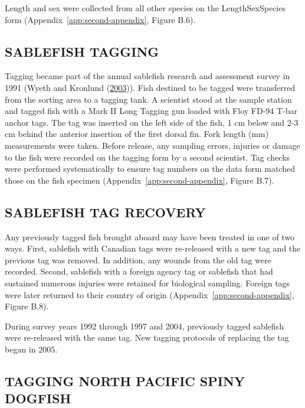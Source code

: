 \documentclass[12pt]{article}\usepackage[]{graphicx}\usepackage[]{color}
\begin{document}
Length and sex were collected from all other species on the LengthSexSpecies form (Appendix~\ref{app:second-appendix}, Figure B.6).

\hypertarget{sablefish-tagging}{%
\subsection{SABLEFISH TAGGING}\label{sablefish-tagging}}

Tagging became part of the annual sablefish research and assessment survey in 1991 (Wyeth and Kronlund (\protect\hyperlink{ref-Wyeth2003}{2003})). Fish destined to be tagged were transferred from the sorting area to a tagging tank. A scientist stood at the sample station and tagged fish with a Mark II Long Tagging gun loaded with Floy FD-94 T-bar anchor tags. The tag was inserted on the left side of the fish, 1 cm below and 2-3 cm behind the anterior insertion of the first dorsal fin. Fork length (mm) measurements were taken. Before release, any sampling errors, injuries or damage to the fish were recorded on the tagging form by a second scientist. Tag checks were performed systematically to ensure tag numbers on the data form matched those on the fish specimen (Appendix~\ref{app:second-appendix}, Figure B.7).

\hypertarget{sablefish-tag-recovery}{%
\subsection{SABLEFISH TAG RECOVERY}\label{sablefish-tag-recovery}}

Any previously tagged fish brought aboard may have been treated in one of two ways. First, sablefish with Canadian tags were re-released with a new tag and the previous tag was removed. In addition, any wounds from the old tag were recorded. Second, sablefish with a foreign agency tag or sablefish that had sustained numerous injuries were retained for biological sampling. Foreign tags were later returned to their country of origin (Appendix~\ref{app:second-appendix}, Figure B.8).

During survey years 1992 through 1997 and 2004, previously tagged sablefish were re-released with the same tag. New tagging protocols of replacing the tag began in 2005.

\hypertarget{tagging-north-pacific-spiny-dogfish}{%
\subsection{TAGGING NORTH PACIFIC SPINY DOGFISH}\label{tagging-north-pacific-spiny-dogfish}}
\end{document}
